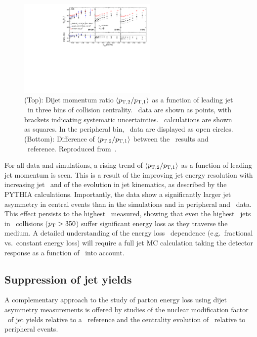 \begin{figure}[!th]
\begin{center}
\includegraphics[width=0.6\textwidth]{jetfigures/deltaPtOverPt5_lead120_sub30_diff_20120103.pdf}
\caption{(Top): Dijet momentum ratio $\langle p_{\rm{T},2}/p_{\rm{T},1} \rangle$ as a function of
leading jet \pT\ in three bins of collision centrality.
\PbPb\ data are shown as points, with brackets indicating systematic uncertainties.  
\PYTHYD\ calculations are shown as squares. In the peripheral bin,
\pp\ data are displayed as open circles.
(Bottom): Difference of $\langle p_{\rm{T},2}/p_{\rm{T},1} \rangle$ between the \PbPb\ results and \PYTHYD\ reference.
Reproduced from~\cite{CMS_dijet}.}
\label{fig:GR:CMS_pt_ratio}
\end{center}
\end{figure}

For all data and simulations, a rising trend of $\langle p_{\rm{T},2}/p_{\rm{T},1} \rangle$ as a function
of leading jet momentum is seen. This is a result of the improving jet energy resolution
with increasing jet \pT\ and of the evolution in jet kinematics, as described by the PYTHIA
calculations. Importantly, the data show a significantly larger jet asymmetry in central events
than in the simulations and in peripheral and \pp\ data. This effect persists to the
highest \pT\ measured, showing that even the highest \pT\ jets in \PbPb\ collisions ($\mbox{$p_{\mathrm{T}}$} > 350$\GeVc)
suffer significant energy loss as they traverse the medium. A detailed understanding of the energy loss
\pT\ dependence (e.g.\ fractional vs.\ constant energy loss) will require a full jet MC calculation
taking the detector response as a function of \pT\ into account.

\subsection{Suppression of jet yields}

A complementary approach to the study of parton energy loss using dijet asymmetry measurements
is offered by studies of the nuclear modification factor \Raa\ of jet yields relative
to a \pp\ reference and the centrality evolution of \Rcp\ relative to peripheral events.

